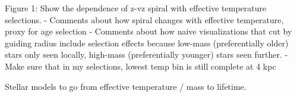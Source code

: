 Figure 1: Show the dependence of z-vz spiral with effective temperature selections.
- Comments about how spiral changes with effective temperature, proxy for age selection
- Comments about how naive visualizations that cut by guiding radius include selection effects because low-mass (preferentially older) stars only seen locally, high-mass (preferentially younger) stars seen further.
- Make sure that in my selections, lowest temp bin is still complete at 4 kpc


Stellar models to go from effective temperature / mass to lifetime.



